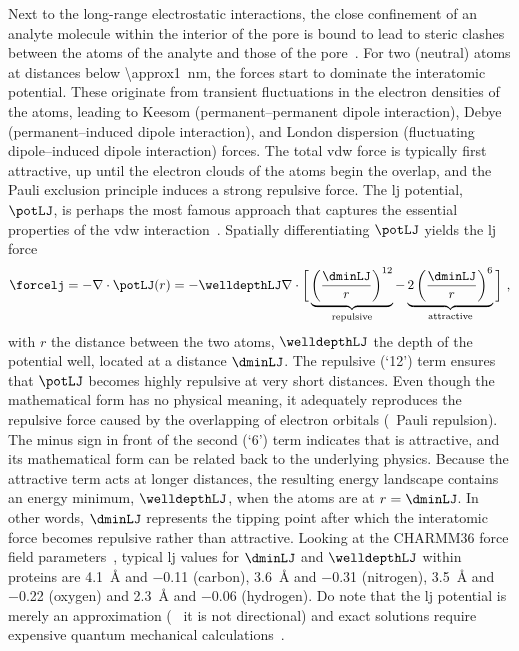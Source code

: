 Next to the long-range electrostatic interactions, the close confinement of an analyte molecule within the
interior of the pore is bound to lead to steric clashes between the atoms of the analyte and those of the
pore~\cite{Buchsbaum-2013}. For two (neutral) atoms at distances below \SI{\approx1}{\nm}, the 
forces start to dominate the interatomic potential. These originate from transient fluctuations in the
electron densities of the atoms, leading to Keesom (permanent--permanent dipole interaction), Debye
(permanent--induced dipole interaction), and London dispersion (fluctuating dipole--induced dipole
interaction) forces. The total \gls{vdw} force is typically first attractive, up until the electron clouds of
the atoms begin the overlap, and the Pauli exclusion principle induces a strong repulsive force. The \gls{lj}
potential, $\potLJ$, is perhaps the most famous approach that captures the essential properties of the
\gls{vdw} interaction~\cite{Paquet-2015}. Spatially differentiating $\potLJ$ yields the \gls{lj} force 
%
\begin{equation}\label{eq:nanopores_LJ_force}
  \forcelj = - \nabla \cdot \potLJ( r ) = - \welldepthLJ \nabla \cdot \bigg[ 
    \underbrace{ \left( \dfrac{ \dminLJ }{ r } \right)^{12} }_{\text{repulsive}}
    -
    \underbrace{ 2 \left( \dfrac{ \dminLJ }{ r } \right)^{6} }_{\text{attractive}}
  \bigg]
  \text{ ,}
\end{equation}
% 
with $r$ the distance between the two atoms, $\welldepthLJ$ the depth of the potential well, located at a distance
$\dminLJ$. The repulsive (`12') term ensures that $\potLJ$ becomes highly repulsive at very short distances.
Even though the mathematical form has no physical meaning, it adequately reproduces the repulsive force caused
by the overlapping of electron orbitals (\ie~Pauli repulsion). The minus sign in front of the second (`6')
term indicates that is attractive, and its mathematical form can be related back to the underlying physics.
Because the attractive term acts at longer distances, the resulting energy landscape contains an energy
minimum, $\welldepthLJ$, when the atoms are at $r = \dminLJ$. In other words, $\dminLJ$ represents the tipping
point after which the interatomic force becomes repulsive rather than attractive. Looking at the {CHARMM36}
force field parameters~\cite{Huang-2016}, typical \gls{lj} values for $\dminLJ$ and $\welldepthLJ$ within
proteins are \SI{4.1}{\angstrom} and \SI{-0.11}{\kbt} (carbon), \SI{3.6}{\angstrom} and \SI{-0.31}{\kbt}
(nitrogen), \SI{3.5}{\angstrom} and \SI{-0.22}{\kbt} (oxygen) and \SI{2.3}{\angstrom} and \SI{-0.06}{\kbt}
(hydrogen). Do note that the \gls{lj} potential is merely an approximation (\eg~ it is not directional) and
exact solutions require expensive quantum mechanical calculations~\cite{Paquet-2015}.

